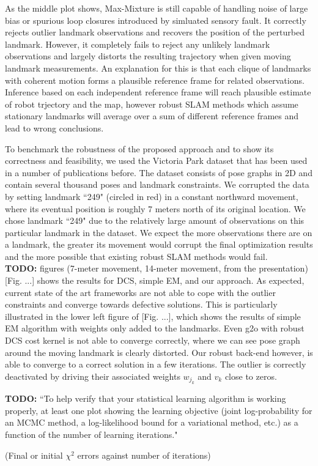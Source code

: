 As the middle plot shows, Max-Mixture is still capable of handling noise of
large bias or spurious loop closures introduced by simluated sensory fault. It
correctly rejects outlier landmark observations and recovers the position of
the perturbed landmark. However, it completely fails to reject any unlikely
landmark observations and largely distorts the resulting trajectory when given
moving landmark measurements. An explanation for this is that each clique of
landmarks with coherent motion forms a plausible reference frame for related
observations. Inference based on each independent reference frame will reach
plausible estimate of robot trjectory and the map, however robust SLAM methods
which assume stationary landmarks will average over a sum of different
reference frames and lead to wrong conclusions.

To benchmark the robustness of the proposed approach and to show its correctness and feasibility, we used the Victoria Park dataset that has been used in a number of publications before. The dataset consists of pose graphs in 2D and contain several thousand poses and landmark constraints. We corrupted the data by setting landmark ``249" (circled in red) in a constant northward movement, where its eventual position is roughly 7 meters north of its original location. We chose landmark ``249" due to the relatively large amount of observations on this particular landmark in the dataset. We expect the more observations there are on a landmark, the greater its movement would corrupt the final optimization results and the more possible that existing robust SLAM methods would fail. \\


\textbf{TODO:} figures (7-meter movement, 14-meter movement, from the presentation) \\


[Fig. ...] shows the results for DCS, simple EM, and our approach. As expected, current state of the art frameworks are not able to cope with the outlier constraints and converge towards defective solutions. This is particularly illustrated in the lower left figure of [Fig. ...], which shows the results of simple EM algorithm with weights only added to the landmarks. Even g2o with robust DCS cost kernel is not able to converge correctly, where we can see pose graph around the moving landmark is clearly distorted. Our robust back-end however, is able to converge to a correct solution in a few iterations. The outlier is correctly deactivated by driving their associated weights $w_{j_k}$ and $v_k$ close to zeros. 



\textbf{TODO:} ``To help verify that your statistical learning algorithm is working properly, at least one plot showing the learning objective (joint log-probability for an MCMC method, a log-likelihood bound for a variational method, etc.) as a function of the number of learning iterations."  

(Final or initial $\chi^2$ errors against number of iterations)  \\




